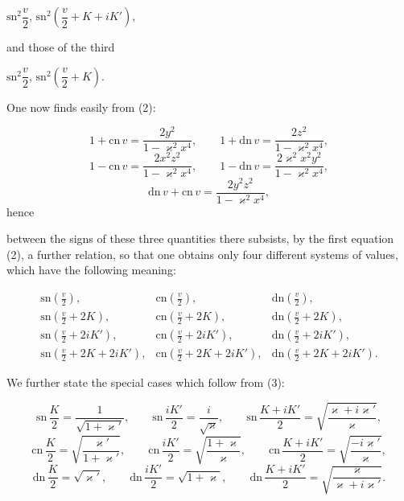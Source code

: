 
$\mathrm{sn}^2\dfrac{v}{2}$, \quad $\mathrm{sn}^2\left(\dfrac{v}{2}+K+iK'\right)$,

and those of the third

$\mathrm{sn}^2\dfrac{v}{2}$, \quad $\mathrm{sn}^2\left(\dfrac{v}{2}+K\right)$.

One now finds easily from (2):

\[
1+\mathrm{cn}\,v = \frac{2y^2}{1-\varkappa^2x^4}, \qquad 1+\mathrm{dn}\,v = \frac{2z^2}{1-\varkappa^2x^4},
\]
\[
1-\mathrm{cn}\,v = \frac{2x^2z^2}{1-\varkappa^2x^4}, \qquad 1-\mathrm{dn}\,v = \frac{2\varkappa^2x^2y^2}{1-\varkappa^2x^4},
\]
\[
\mathrm{dn}\,v+\mathrm{cn}\,v = \frac{2y^2z^2}{1-\varkappa^2x^4},
\]
hence


between the signs of these three quantities there subsists, by the
first equation (2), a further relation, so that one obtains only four
different systems of values, which have the following meaning:

\[
\begin{array}{ccc}
\mathrm{sn}\left(\frac{v}{2}\right), & \mathrm{cn}\left(\frac{v}{2}\right), & \mathrm{dn}\left(\frac{v}{2}\right),\\
\mathrm{sn}\left(\frac{v}{2}+2K\right), & \mathrm{cn}\left(\frac{v}{2}+2K\right), & \mathrm{dn}\left(\frac{v}{2}+2K\right),\\
\mathrm{sn}\left(\frac{v}{2}+2iK'\right), & \mathrm{cn}\left(\frac{v}{2}+2iK'\right), & \mathrm{dn}\left(\frac{v}{2}+2iK'\right),\\
\mathrm{sn}\left(\frac{v}{2}+2K+2iK'\right), & \mathrm{cn}\left(\frac{v}{2}+2K+2iK'\right), & \mathrm{dn}\left(\frac{v}{2}+2K+2iK'\right).
\end{array}
\]

We further state the special cases which follow from (3):

\[
\mathrm{sn}\,\frac{K}{2} = \frac{1}{\sqrt{1+\varkappa'}}, \qquad
\mathrm{sn}\,\frac{iK'}{2} = \frac{i}{\sqrt{\varkappa}}, \qquad
\mathrm{sn}\,\frac{K+iK'}{2} = \sqrt{\frac{\varkappa+i\varkappa'}{\varkappa}},
\]
\[
\mathrm{cn}\,\frac{K}{2} = \sqrt{\frac{\varkappa'}{1+\varkappa'}}, \qquad
\mathrm{cn}\,\frac{iK'}{2} = \sqrt{\frac{1+\varkappa}{\varkappa}}, \qquad
\mathrm{cn}\,\frac{K+iK'}{2} = \sqrt{\frac{-i\varkappa'}{\varkappa}},
\]
\[
\mathrm{dn}\,\frac{K}{2} = \sqrt{\varkappa'}, \qquad
\mathrm{dn}\,\frac{iK'}{2} = \sqrt{1+\varkappa}, \qquad
\mathrm{dn}\,\frac{K+iK'}{2} = \sqrt{\frac{\varkappa}{\varkappa+i\varkappa'}}.
\]
